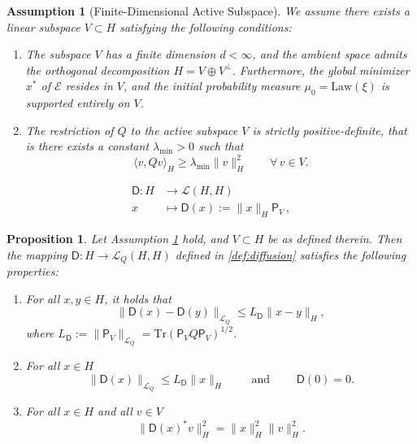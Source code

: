 \documentclass[10pt,a4paper]{amsart}
\newtheorem{assumption}{Assumption}
\newtheorem{proposition}{Proposition}
\begin{document}
\begin{assumption}[Finite-Dimensional Active Subspace] \label{assump:active_subspace}
We assume there exists a linear subspace $V \subset H$ satisfying the following conditions:

\begin{enumerate}[label=(\roman*)]
    \item 
    The subspace $V$ has a finite dimension $d < \infty$, and the ambient space admits the orthogonal decomposition $H = V \oplus V^\perp$. Furthermore, the global minimizer $x^*$ of $\mathscr{E}$ resides in $V$, and the initial probability measure $\mu_0 = \mathrm{Law}(\xi)$ is supported entirely on $V$. 
    
    \item 
    The restriction of $Q$ to the active subspace $V$ is strictly positive-definite, that is there exists a constant $\lambda_{\min} > 0$ such that
    \begin{equation*}
        \langle v, Q v \rangle_H \geq \lambda_{\min} \|v\|_H^2 \qquad \forall\,v\in V.
    \end{equation*}
\end{enumerate}
\end{assumption}

\begin{equation}\label{def:diffusion}
\begin{aligned}
    \mathsf{D}: H & \longrightarrow \mathscr{L}(H,H) \\
    x & \longmapsto \mathsf{D}(x) := \|x\|_H \mathsf{P}_V\,,
\end{aligned}
\end{equation}

\begin{proposition}
\label{prop:diffusion}
Let Assumption \ref{assump:active_subspace} hold, and $V\subset H$ be as defined therein.  
Then the mapping $\mathsf{D}: H \to \mathscr{L}_Q(H, H)$ defined in \eqref{def:diffusion} satisfies the following properties:

\begin{enumerate}
    \item 
    For all $x, y \in H$, it holds that
    \begin{equation*}
        \|\mathsf{D}(x) - \mathsf{D}(y)\|_{\mathscr{L}_Q} \leq   L_{\mathsf{D}} \|x - y\|_H,
    \end{equation*}
    where $L_{\mathsf{D}}:=\|\mathsf{P}_V\|_{\mathscr{L}_Q}=\mathrm{Tr}(\mathsf{P}_V Q \mathsf{P}_V)^{1/2}$.
    
    \item 
    For all $x\in H$
    \begin{equation*}
        \|\mathsf{D}(x)\|_{\mathscr{L}_Q} \leq  L_{\mathsf{D}}\|x\|_H \qquad \text{ and } \qquad \mathsf{D}(0) = 0.
    \end{equation*}

    
    \item  
    For all $x \in H$ and all $v \in V$
    \begin{equation*}
        \|\mathsf{D}(x)^* v\|_H^2 =  \|x\|_H^2 \|v\|_H^2.
    \end{equation*}
\end{enumerate}
\end{proposition}
\end{document}
